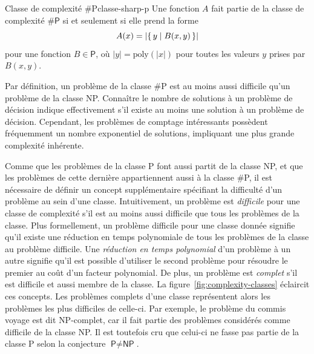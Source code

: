 \begin{maindefinition}{Classe de complexité \textsf{\#P}}{classe-sharp-p}
    Une fonction $A$ fait partie de la classe de complexité $\textsf{\#P}$ si et seulement si elle prend la forme
    \begin{equation*}
        A(x) = \lvert \set{ y \mid B(x, y)} \rvert
    \end{equation*}
    pour une fonction $B \in \textsf{P}$, où $\lvert y \rvert = \mathrm{poly}(\lvert x \rvert)$ pour toutes les valeurs $y$ prises par $B(x,y)$.
\end{maindefinition}

Par définition, un problème de la classe \textsf{\#P} est au moins aussi difficile qu'un problème de la classe \textsf{NP}. Connaître le nombre de solutions à un problème de décision indique effectivement s'il existe au moins une solution à un problème de décision. Cependant, les problèmes de comptage intéressants possèdent fréquemment un nombre exponentiel de solutions, impliquant une plus grande complexité inhérente.

Comme que les problèmes de la classe \textsf{P} font aussi partit de la classe \textsf{NP}, et que les problèmes de cette dernière appartiennent aussi à la classe \textsf{\#P}, il est nécessaire de définir un concept supplémentaire spécifiant la difficulté d'un problème au sein d'une classe. Intuitivement, un problème est \textit{difficile} pour une classe de complexité s'il est au moins aussi difficile que tous les problèmes de la classe. Plus formellement, un problème difficile pour une classe donnée signifie qu'il existe une réduction en temps polynomiale de tous les problèmes de la classe au problème difficile. Une \textit{réduction en temps polynomial} d'un problème à un autre signifie qu'il est possible d'utiliser le second problème pour résoudre le premier au coût d'un facteur polynomial. De plus, un problème est \textit{complet} s'il est difficile et aussi membre de la classe. La figure~\ref{fig:complexity-classes} éclaircit ces concepts. Les problèmes complets d'une classe représentent alors les problèmes les plus difficiles de celle-ci. Par exemple, le problème du commis voyage est dit \textsf{NP}-complet, car il fait partie des problèmes considérés comme difficile de la classe \textsf{NP}. Il est toutefois cru que celui-ci ne fasse pas partie de la classe \textsf{P} selon la conjecture $\textsf{P} \neq \textsf{NP}$.

